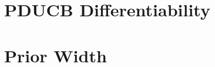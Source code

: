 \documentclass[11pt,a4paper,twoside,BCOR=15mm]{scrbook}
\newtheorem{theorem}{Theorem}
\newcommand{\mat}[1]{\bm{#1}}
\newcommand{\Tr}{^{\top}}
\begin{document}



\chapter{PDUCB Differentiability}\label{sec:pducb-diff}

\chapter{Prior Width}\label{sec:prior}

\backmatter{}
\listoffigures{}
\printbibliography{}
\end{document}
